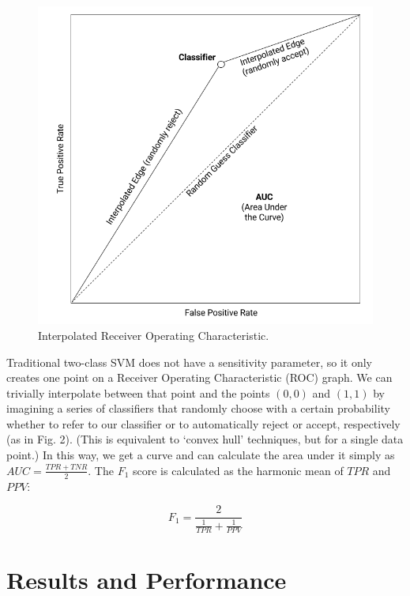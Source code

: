 \documentclass[format=acmlarge]{acmart}
\begin{document}
\begin{figure}
  \includegraphics{interpolated-roc}
  \caption{Interpolated Receiver Operating Characteristic.}
  \label{fig:two}
\end{figure}

Traditional two-class SVM does not have a sensitivity parameter, so it only creates one point on a Receiver Operating Characteristic (ROC) graph.  We can trivially interpolate between that point and the points $(0, 0)$ and $(1, 1)$ by imagining a series of classifiers that randomly choose with a certain probability whether to refer to our classifier or to automatically reject or accept, respectively (as in Fig. 2).  (This is equivalent to `convex hull' techniques, but for a single data point.)  In this way, we get a curve and can calculate the area under it simply as $\mathit{AUC} = \frac{\mathit{TPR} + \mathit{TNR}}{2}$.  The $F_1$ score is calculated as the harmonic mean of $\mathit{TPR}$ and $\mathit{PPV}$:

$$F_1 = \frac{2}{\frac{1}{\mathit{TPR}} + \frac{1}{\mathit{PPV}}}$$

\section{Results and Performance}
\end{document}

